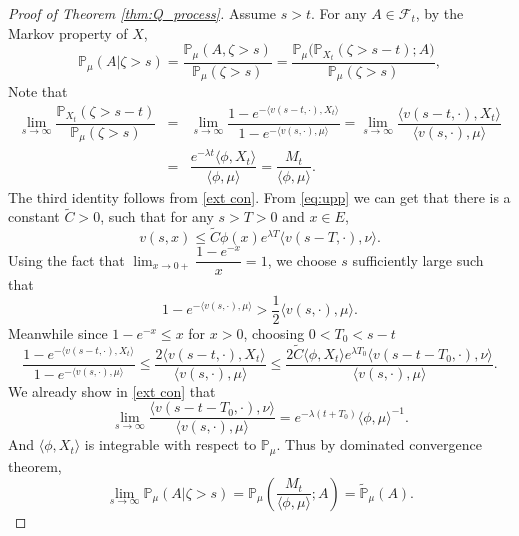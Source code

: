 \documentclass[12pt,a4paper]{amsart}
\numberwithin{equation}{section}
\theoremstyle{plain}
\theoremstyle{definition}
\begin{document}
{%
\begin{proof}[Proof of Theorem \ref{thm:Q_process}]
  Assume $s>t$.  For any $A\in\mathscr F_t$, by the Markov property of $X$,
  \[
    \mathbb P_\mu(A|\zeta>s)=\dfrac{\mathbb P_\mu(A, \zeta>s)}{\mathbb P_\mu(\zeta>s)}=\dfrac{\mathbb P_\mu\big(\mathbb P_{X_t}(\zeta>s-t);A\big)}{\mathbb P_\mu(\zeta>s)},
  \]
  Note that
  \begin{eqnarray*}
    \lim_{s\rightarrow\infty}\dfrac{\mathbb P_{X_t}(\zeta>s-t)}{\mathbb P_\mu(\zeta>s)}
    &=&\lim_{s\rightarrow\infty}\dfrac{1-e^{-\langle v(s-t,\cdot),X_t\rangle }}{1-e^{-\langle v(s,\cdot),\mu\rangle }}
        =\lim_{s\rightarrow\infty}\dfrac{\langle v(s-t,\cdot),X_t\rangle }{\langle v(s,\cdot),\mu\rangle }\\
    &=& \dfrac{e^{-\lambda t}\langle \phi, X_t\rangle }{\langle \phi,\mu\rangle }=\dfrac{M_t}{\langle \phi,\mu\rangle }.
  \end{eqnarray*}
  The third identity follows from \eqref{ext con}.  From \eqref{eq:upp} we can get that there is a constant $\widetilde C>0$, such that for any $s>T>0$ and $x\in E$,
  \[
    v(s,x)\leq \widetilde C\phi(x)e^{\lambda T}\langle v(s-T,\cdot),\nu\rangle .
  \]
  Using the fact that $\lim_{x\rightarrow 0+}\dfrac{1-e^{-x}}{x}=1$, we choose $s$ sufficiently large such that
  \[
    1-e^{-\langle v(s,\cdot),\mu\rangle }>\frac{1}{2}\langle v(s,\cdot),\mu\rangle .
  \]
  Meanwhile since $1-e^{-x}\leq x$ for $x>0$, choosing $0<T_0<s-t$
  \[
    \dfrac{1-e^{-\langle v(s-t,\cdot),X_t\rangle }}{1-e^{-\langle v(s,\cdot),\mu\rangle }}
    \leq \dfrac{2\langle v(s-t,\cdot),X_t\rangle }{\langle v(s,\cdot),\mu\rangle }\leq \dfrac{2\widetilde C\langle \phi,X_t\rangle e^{\lambda T_0}\langle v(s-t-T_0,\cdot),\nu\rangle }{\langle v(s,\cdot),\mu\rangle }.
  \]
  We already show in \eqref{ext con} that
  \[
    \lim_{s\rightarrow\infty}\dfrac{\langle v(s-t-T_0,\cdot),\nu\rangle }{\langle v(s,\cdot),\mu\rangle }
    =e^{-\lambda(t+T_0)}\langle \phi,\mu\rangle ^{-1}.
  \]
  And $\langle \phi,X_t\rangle $ is integrable with respect to $\mathbb P_\mu$.  Thus by dominated convergence theorem,
  \[
    \lim_{s\rightarrow\infty}\mathbb P_\mu(A|\zeta>s)=\mathbb P_\mu\left(\frac{M_t}{\langle\phi,\mu\rangle };A\right)=\widetilde{\mathbb P}_\mu(A).
  \]
\end{proof}
}
\end{document}
